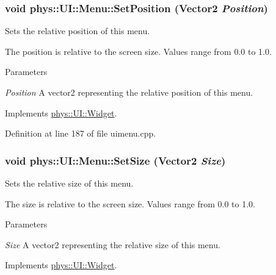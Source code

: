 \hypertarget{classphys_1_1UI_1_1Menu_a8c10ff94f6830198069b86ffca13180a}{
\subsubsection[{SetPosition}]{\setlength{\rightskip}{0pt plus 5cm}void phys::UI::Menu::SetPosition ({\bf Vector2} {\em Position})}}
\label{d6/dd3/classphys_1_1UI_1_1Menu_a8c10ff94f6830198069b86ffca13180a}


Sets the relative position of this menu. 

The position is relative to the screen size. Values range from 0.0 to 1.0. 
\begin{DoxyParams}{Parameters}
\item[{\em Position}]A vector2 representing the relative position of this menu. \end{DoxyParams}


Implements \hyperlink{classphys_1_1UI_1_1Widget_aae1c0b891125823e7ade8cbc7e4ba6b6}{phys::UI::Widget}.



Definition at line 187 of file uimenu.cpp.

\hypertarget{classphys_1_1UI_1_1Menu_a49953d0696195add1c2909cfa5bca0ec}{
\subsubsection[{SetSize}]{\setlength{\rightskip}{0pt plus 5cm}void phys::UI::Menu::SetSize ({\bf Vector2} {\em Size})}}
\label{d6/dd3/classphys_1_1UI_1_1Menu_a49953d0696195add1c2909cfa5bca0ec}


Sets the relative size of this menu. 

The size is relative to the screen size. Values range from 0.0 to 1.0. 
\begin{DoxyParams}{Parameters}
\item[{\em Size}]A vector2 representing the relative size of this menu. \end{DoxyParams}


Implements \hyperlink{classphys_1_1UI_1_1Widget_ad5af5f04b60d43341037df6b0e329bbd}{phys::UI::Widget}.



